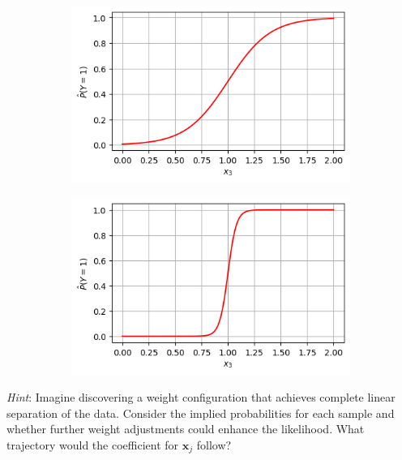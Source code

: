\documentclass[11pt,addpoints,answers]{exam}
\newcommand{\xv}{\mathbf{x}}
\begin{document}
\begin{enumerate}
\begin{enumerate}[label=\alph*), itemsep=10pt]
\begin{enumerate}[label=(\roman*), leftmargin=*]
				\begin{figure}[h]
					\centering
					\begin{subfigure}[t]{0.42\textwidth}
						\centering
						\includegraphics[width=\textwidth]{fig/Plot A.png}
						\caption{}
					\end{subfigure}
					\hfill
					\begin{subfigure}[t]{0.42\textwidth}
						\centering
						\includegraphics[width=\textwidth]{fig/Plot B.png}
						\caption{}
					\end{subfigure}
				\end{figure}
				
				\textit{Hint}: Imagine discovering a weight configuration that achieves complete linear separation of the data. Consider the implied probabilities for each sample and whether further weight adjustments could enhance the likelihood. What trajectory would the coefficient for $\xv_j$ follow?
				

\end{enumerate}
\end{enumerate}
\end{enumerate}
\end{document}
